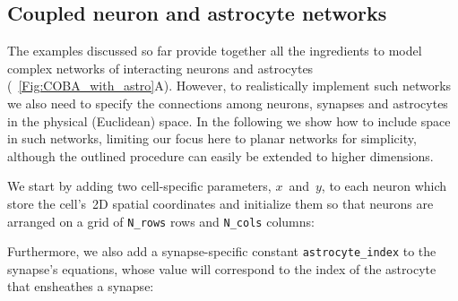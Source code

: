 \documentclass[a4paper, 11pt]{article}
\newcommand*{\figref}[1]{\figurename~\ref{#1}}
\begin{document}
\subsection{Coupled neuron and astrocyte networks}\label{sec:ng-network}
The examples discussed so far provide together all the ingredients to model complex networks of interacting neurons and astrocytes (\figref{Fig:COBA_with_astro}A).
However, to realistically implement such networks we also need to specify the connections among neurons, synapses and astrocytes in the physical (Euclidean) space.
In the following we show how to include space in such networks, limiting our focus here to planar networks for simplicity, although the outlined procedure can easily be extended to higher dimensions.

We start by adding two cell-specific parameters, $x$~and~$y$, to each neuron which store the cell's~2D spatial coordinates and initialize them so that neurons are arranged on a grid of \lstinline|N_rows| rows and \lstinline|N_cols| columns:

Furthermore, we also add a synapse-specific constant \lstinline|astrocyte_index| to the synapse's equations, whose value will correspond to the index of the astrocyte that ensheathes a synapse: 

\end{document}
